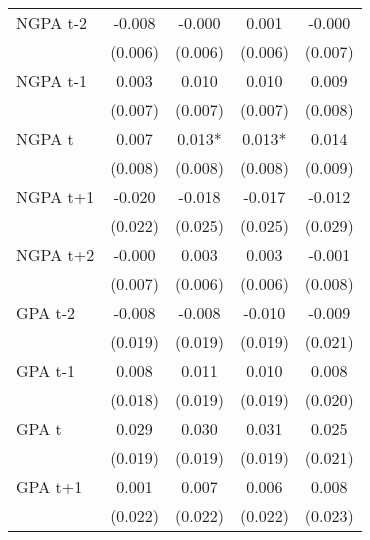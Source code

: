 {{\begin{tabular}{lcccc}
NGPA t-2            &      -0.008   &      -0.000   &       0.001   &      -0.000   \\
                    &     (0.006)   &     (0.006)   &     (0.006)   &     (0.007)   \\
 
NGPA t-1            &       0.003   &       0.010   &       0.010   &       0.009   \\
                    &     (0.007)   &     (0.007)   &     (0.007)   &     (0.008)   \\
 
NGPA t              &       0.007   &       0.013*  &       0.013*  &       0.014   \\
                    &     (0.008)   &     (0.008)   &     (0.008)   &     (0.009)   \\
 
NGPA t+1            &      -0.020   &      -0.018   &      -0.017   &      -0.012   \\
                    &     (0.022)   &     (0.025)   &     (0.025)   &     (0.029)   \\
 
NGPA t+2            &      -0.000   &       0.003   &       0.003   &      -0.001   \\
                    &     (0.007)   &     (0.006)   &     (0.006)   &     (0.008)   \\
 
GPA t-2             &      -0.008   &      -0.008   &      -0.010   &      -0.009   \\
                    &     (0.019)   &     (0.019)   &     (0.019)   &     (0.021)   \\
 
GPA t-1             &       0.008   &       0.011   &       0.010   &       0.008   \\
                    &     (0.018)   &     (0.019)   &     (0.019)   &     (0.020)   \\
 
GPA t               &       0.029   &       0.030   &       0.031   &       0.025   \\
                    &     (0.019)   &     (0.019)   &     (0.019)   &     (0.021)   \\
 
GPA t+1             &       0.001   &       0.007   &       0.006   &       0.008   \\
                    &     (0.022)   &     (0.022)   &     (0.022)   &     (0.023)   \\
 

\end{tabular}}}
